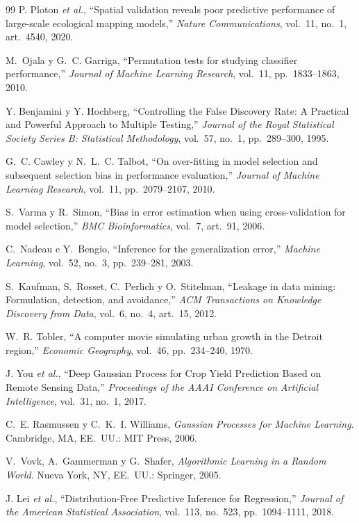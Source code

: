\begin{thebibliography}{99}
P. Ploton \emph{et al.}, ``Spatial validation reveals poor predictive performance of large-scale ecological mapping models,'' \emph{Nature Communications}, vol.~11, no.~1, art.~4540, 2020.

M.~Ojala y G.~C. Garriga, ``Permutation tests for studying classifier performance,'' \emph{Journal of Machine
Learning Research}, vol.~11, pp.~1833--1863, 2010.

Y. Benjamini y Y. Hochberg, ``Controlling the False Discovery Rate: A Practical and Powerful Approach to Multiple Testing,'' \emph{Journal of the Royal Statistical Society Series B: Statistical Methodology}, vol.~57, no.~1, pp.~289--300, 1995.

G.~C. Cawley y N.~L.~C. Talbot, ``On over-fitting in model selection and subsequent selection bias in performance
evaluation,'' \emph{Journal of Machine Learning Research}, vol.~11, pp.~2079--2107, 2010.

S.~Varma y R.~Simon, ``Bias in error estimation when using cross-validation for model selection,'' \emph{BMC
Bioinformatics}, vol.~7, art.~91, 2006.

C.~Nadeau e Y.~Bengio, ``Inference for the generalization error,'' \emph{Machine Learning}, vol.~52, no.~3,
pp.~239--281, 2003.

S.~Kaufman, S.~Rosset, C.~Perlich y O.~Stitelman, ``Leakage in data mining: Formulation, detection, and
avoidance,'' \emph{ACM Transactions on Knowledge Discovery from Data}, vol.~6, no.~4, art.~15, 2012.

W.~R. Tobler, ``A computer movie simulating urban growth in the Detroit region,'' \emph{Economic Geography},
vol.~46, pp.~234--240, 1970.

J. You \emph{et al.}, ``Deep Gaussian Process for Crop Yield Prediction Based on Remote Sensing Data,'' \emph{Proceedings of the AAAI Conference on Artificial Intelligence}, vol.~31, no.~1, 2017.

C.~E. Rasmussen y C.~K.~I. Williams, \emph{Gaussian Processes for Machine Learning}. Cambridge, MA, EE.~UU.: MIT
Press, 2006.

V.~Vovk, A.~Gammerman y G.~Shafer, \emph{Algorithmic Learning in a Random World}. Nueva York, NY, EE.~UU.:
Springer, 2005.

J. Lei \emph{et al.}, ``Distribution-Free Predictive Inference for Regression,'' \emph{Journal of the American Statistical Association}, vol.~113, no.~523, pp.~1094--1111, 2018.


\end{thebibliography}
